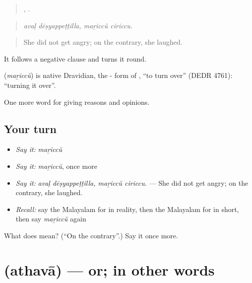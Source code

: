 \begin{quote}
 ,  .
\end{quote}

\begin{quote}
\emph{avaḷ dēṣyappeṭṭilla, maṟiccŭ ciriccu.}
\end{quote}

\begin{quote}
She did not get angry; on the contrary, she laughed.
\end{quote}

It follows a negative clause and turns it round.

\begin{cousinweb}
\textbf{} (\emph{maṟiccŭ}) is native Dravidian, the - form of , \textquotedblleft{}to turn over\textquotedblright{} (DEDR 4761): \textquotedblleft{}turning it over\textquotedblright{}.
\end{cousinweb}

\begin{grammarlens}[title={What you've built}]
One more word for giving reasons and opinions.
\end{grammarlens}

\subsection*{Your turn}
\begin{itemize}
\raggedright
  \item \emph{Say it:} \emph{maṟiccŭ}
  \item \emph{Say it:} \emph{maṟiccŭ}, once more
  \item \emph{Say it:} \emph{avaḷ dēṣyappeṭṭilla, maṟiccŭ ciriccu.} — She did not get angry; on the contrary, she laughed.
  \item \emph{Recall:} say the Malayalam for in reality, then the Malayalam for in short, then say \emph{maṟiccŭ} again
\end{itemize}

\begin{tcolorbox}[breakable,colback=teal!4,colframe=teal!35!black,title={Before you move on}]
What does  mean? (\textquotedblleft{}On the contrary\textquotedblright{}.) Say it once more.
\end{tcolorbox}
\section[\texorpdfstring{\ml{അഥവാ} (athavā)}{അഥവാ (athavā)}]{ (athavā) — or; in other words}

